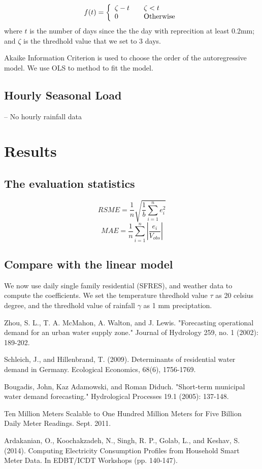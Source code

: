 \documentclass{sig-alternate}
\begin{document}
\[
f(t) =  \left\{ 
  \begin{array}{l l}
    \zeta - t & \quad \zeta <t\\
     0 & \quad \text{Otherwise}
  \end{array} \right.\]  
where $t$ is the number of days since the the day with reprecition at least 0.2mm; and $\zeta$ is the thredhold value that we set to 3 days.

Akaike Information Criterion is used to choose the order of the autoregressive model. We use OLS to method  to fit the model.
\subsection{Hourly Seasonal Load}
-- No hourly rainfall data


\section{Results}
\subsection{The evaluation statistics}

\[
RSME = \frac{1}{n}\sqrt{\frac{1}{b} \sum_{i=1}^{n} e_i^2}
\]
\[
MAE = \frac{1}{n} \sum_{i=1}^{n}|\frac{e_i}{V_{obs}}|
\]

\subsection{Compare with the linear model}
We now use daily single family residential (SFRES), and weather data to compute the coefficients. We set the temperature thredhold value $\tau$ as 20 celsius degree, and the thredhold value of rainfall $\gamma$ as 1 mm preciptation.



\medskip
\begin{thebibliography}{1}

Zhou, S. L., T. A. McMahon, A. Walton, and J. Lewis. "Forecasting operational demand for an urban water supply zone." Journal of Hydrology 259, no. 1 (2002): 189-202.

Schleich, J., and Hillenbrand, T. (2009). Determinants of residential water demand in Germany. Ecological Economics, 68(6), 1756-1769.

Bougadis, John, Kaz Adamowski, and Roman Diduch. "Short‐term municipal water demand forecasting." Hydrological Processes 19.1 (2005): 137-148.

Ten Million Meters Scalable to One Hundred Million Meters for Five Billion Daily Meter Readings. Sept. 2011.

Ardakanian, O., Koochakzadeh, N., Singh, R. P., Golab, L., and Keshav, S. (2014). Computing Electricity Consumption Profiles from Household Smart Meter Data. In EDBT/ICDT Workshops (pp. 140-147).

\end{thebibliography}
\end{document}
